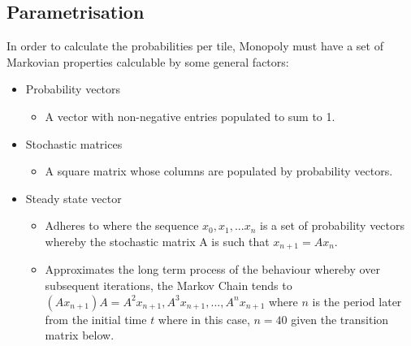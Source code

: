\documentclass[12pt]{article}
\begin{document}
\subsection{Parametrisation}
In order to calculate the probabilities per tile, Monopoly must have a set of Markovian properties calculable by some general factors:
\begin{itemize}
\item Probability vectors
\begin{itemize}
\item A vector with non-negative entries populated to sum to 1.
\end{itemize}
\item Stochastic matrices
\begin{itemize}
\item A square matrix whose columns are populated by probability vectors.
\end{itemize}
\item Steady state vector
\begin{itemize}
\item Adheres to where the sequence $x_0,x_1,...x_n$ is a set of probability vectors whereby the stochastic matrix A is such that $x_{n+1}=Ax_{n}$.
\item Approximates the long term process of the behaviour whereby over subsequent iterations, the Markov Chain tends to $(Ax_{n+1})A=A^2x_{n+1},A^3x_{n+1},...,A^nx_{n+1}$ where $n$ is the period later from the initial time $t$ where in this case, $n=40$ given the transition matrix below.
\end{itemize}
\end{itemize}
\end{document}
